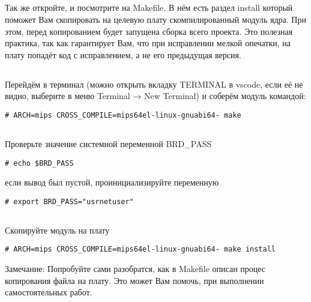 \subsection{}Так же откройте, и посмотрите на Makefile. В нём есть раздел install который поможет Вам скопировать на целевую плату скомпилированный модуль ядра. При этом, перед копированием будет запущена сборка всего проекта. Это полезная практика, так как гарантирует Вам, что при исправлении мелкой опечатки, на плату попадёт код с исправлением, а не его предыдущая версия.

\subsection{}Перейдём в терминал (можно открыть вкладку TERMINAL в vscode, если её не видно, выберите в меню Terminal → New Terminal) и соберём модуль командой:
\begin{lstlisting}[style=bash]
# ARCH=mips CROSS_COMPILE=mips64el-linux-gnuabi64- make 
\end{lstlisting}

\subsection{}Проверьте значение системной переменной BRD\_PASS  
\begin{lstlisting}[style=bash]
# echo $BRD_PASS
\end{lstlisting}
если вывод был пустой, проинициализируйте переменную 
\begin{lstlisting}[style=bash]
# export BRD_PASS="usrnetuser" 
\end{lstlisting}

\subsection{}Скопируйте модуль на плату
\begin{lstlisting}[style=bash]
	# ARCH=mips CROSS_COMPILE=mips64el-linux-gnuabi64- make install
\end{lstlisting}
\begin{Notes}{Замечание:}
	Попробуйте сами разобратся, как в Makefile описан процес копирования файла на плату. Это может Вам помочь, при выполнении самостоятельных работ.
\end{Notes}

